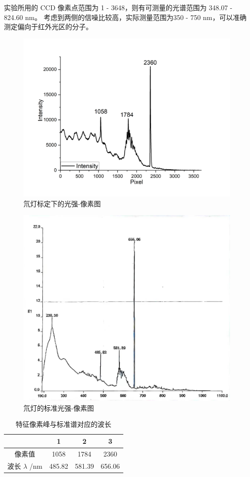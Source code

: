 \documentclass[cn,hazy,pku,12pt,normal,math=newtx,cite=super]{elegantnote}
\begin{document}
实验所用的 CCD 像素点范围为 1 - 3648，则有可测量的光谱范围为 348.07 - 824.60 nm。
考虑到两侧的信噪比较高，实际测量范围为350 - 750 nm，可以准确测定偏向于红外光区的分子。



\begin{figure}[htbp]
    \centering
    \includegraphics[width = .70\textwidth]{image/biaoding.png}
    \caption{氘灯标定下的光强-像素图}\label{5--}
\end{figure}    

\begin{figure}[htbp]
    \centering
    \includegraphics[width = .60\textwidth]{image/standard.jpg}
    \caption{氘灯的标准光强-像素图}\label{5-}
\end{figure} 


\begin{table}[htbp]
    \centering
    \caption{特征像素峰与标准谱对应的波长}\label{6}
    \begin{tabular}{cccc}
    \hline
            & 1      & 2      & 3      \\ \hline
    像素值     & 1058   & 1784   & 2360   \\
    \multicolumn{1}{l}{波长 $\lambda$ /nm} & 485.82 & 581.39 & 656.06 \\ \hline
    \end{tabular}
\end{table}
\end{document}

